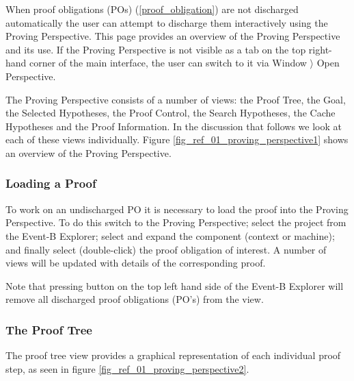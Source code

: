 When proof obligations (POs) (\ref{proof_obligation}) are not discharged automatically the user can attempt to discharge them interactively using the Proving Perspective. This page provides an overview of the Proving Perspective and its use. If the Proving Perspective is not visible as a tab on the top right-hand corner of the main interface, the user can switch to it via \textsf{Window $\rangle$ Open Perspective}.

The Proving Perspective consists of a number of views: the \textsf{Proof Tree}, the \textsf{Goal}, the \textsf{Selected Hypotheses}, the \textsf{Proof Control}, the \textsf{Search Hypotheses}, the \textsf{Cache Hypotheses} and the \textsf{Proof Information}. In the discussion that follows we look at each of these views individually. Figure \ref{fig_ref_01_proving_perspective1} shows an overview of the Proving Perspective.


\subsubsection{Loading a Proof}

To work on an undischarged PO it is necessary to load the proof into the Proving Perspective. To do this switch to the Proving Perspective; select the project from the Event-B Explorer; select and expand the component (context or machine); and finally select (double-click) the proof obligation of interest. A number of views will be updated with details of the corresponding proof. 

Note that pressing  button on the top left hand side of the \textsf{Event-B Explorer} will remove all discharged proof obligations (PO's) from the view. 

\subsubsection{The Proof Tree}

The proof tree view provides a graphical representation of each individual proof step, as seen in figure \ref{fig_ref_01_proving_perspective2}.

